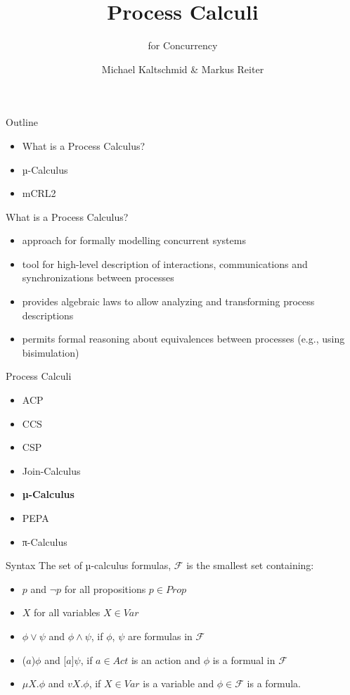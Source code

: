 \documentclass{beamer}
\title{Process Calculi}
\subtitle{for Concurrency}
\author{Michael Kaltschmid \& Markus Reiter}
\date{}
\begin{document}
  \maketitle

  \begin{frame}{Outline}
    \begin{itemize}
      \item What is a Process Calculus?
      \item µ-Calculus
      \item mCRL2
    \end{itemize}
  \end{frame}

  \begin{frame}{What is a Process Calculus?}
    \begin{itemize}
      \item approach for formally modelling concurrent systems
      \item tool for high-level description of interactions, communications and synchronizations between processes
      \item provides algebraic laws to allow analyzing and transforming process descriptions
      \item permits formal reasoning about equivalences between processes (e.g., using bisimulation)
    \end{itemize}
  \end{frame}

  \begin{frame}{Process Calculi}
    \begin{itemize}
      \item ACP
      \item CCS
      \item CSP
      \item Join-Calculus
      \item \textbf{µ-Calculus}
      \item PEPA
      \item π-Calculus
    \end{itemize}
  \end{frame}

  \begin{frame}{Syntax}
    The set of µ-calculus formulas, $\mathcal{F}$ is the smallest set containing: \\[12pt]
    \begin{itemize}
      \item $p$ and $\neg p$ for all propositions $p \in Prop$ \\
      \item $X$ for all variables $X \in Var$ \\
      \item $\phi \lor \psi$ and $\phi \land \psi$, if $\phi$, $\psi$ are formulas in $\mathcal{F}$
      \item ($a$)$\phi$ and [$a$]$\psi$, if $a \in Act$ is an action and $\phi$ is a formual in  $\mathcal{F}$
      \item $\mu X. \phi$ and $v X. \phi$, if $X \in Var$ is a variable and $\phi \in \mathcal{F}$ is a formula.
    \end{itemize}
  \end{frame}
\end{document}
